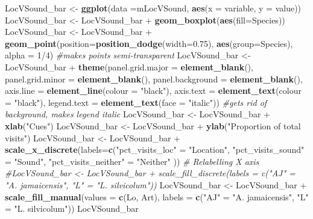 \documentclass[]{article}
\newenvironment{Shaded}{\begin{snugshade}}{\end{snugshade}}
\newcommand{\KeywordTok}[1]{\textcolor[rgb]{0.13,0.29,0.53}{\textbf{{#1}}}}
\newcommand{\DataTypeTok}[1]{\textcolor[rgb]{0.13,0.29,0.53}{{#1}}}
\newcommand{\DecValTok}[1]{\textcolor[rgb]{0.00,0.00,0.81}{{#1}}}
\newcommand{\FloatTok}[1]{\textcolor[rgb]{0.00,0.00,0.81}{{#1}}}
\newcommand{\StringTok}[1]{\textcolor[rgb]{0.31,0.60,0.02}{{#1}}}
\newcommand{\CommentTok}[1]{\textcolor[rgb]{0.56,0.35,0.01}{\textit{{#1}}}}
\newcommand{\NormalTok}[1]{{#1}}
\begin{document}
\begin{Shaded}
\begin{Highlighting}[]
\NormalTok{LocVSound_bar <-}\StringTok{ }\KeywordTok{ggplot}\NormalTok{(}\DataTypeTok{data =}\NormalTok{mLocVSound, }\KeywordTok{aes}\NormalTok{(}\DataTypeTok{x =} \NormalTok{variable, }\DataTypeTok{y =} \NormalTok{value))}
\NormalTok{LocVSound_bar <-}\StringTok{ }\NormalTok{LocVSound_bar +}\StringTok{ }\KeywordTok{geom_boxplot}\NormalTok{(}\KeywordTok{aes}\NormalTok{(}\DataTypeTok{fill=}\NormalTok{Species))}
\NormalTok{LocVSound_bar <-}\StringTok{ }\NormalTok{LocVSound_bar +}\StringTok{ }\KeywordTok{geom_point}\NormalTok{(}\DataTypeTok{position=}\KeywordTok{position_dodge}\NormalTok{(}\DataTypeTok{width=}\FloatTok{0.75}\NormalTok{), }\KeywordTok{aes}\NormalTok{(}\DataTypeTok{group=}\NormalTok{Species), }\DataTypeTok{alpha =} \DecValTok{1}\NormalTok{/}\DecValTok{4}\NormalTok{) }\CommentTok{#makes points semi-transparent}
\NormalTok{LocVSound_bar <-}\StringTok{ }\NormalTok{LocVSound_bar +}\StringTok{ }\KeywordTok{theme}\NormalTok{(}\DataTypeTok{panel.grid.major =} \KeywordTok{element_blank}\NormalTok{(), }\DataTypeTok{panel.grid.minor =} \KeywordTok{element_blank}\NormalTok{(),}
\DataTypeTok{panel.background =} \KeywordTok{element_blank}\NormalTok{(), }\DataTypeTok{axis.line =} \KeywordTok{element_line}\NormalTok{(}\DataTypeTok{colour =} \StringTok{"black"}\NormalTok{), }\DataTypeTok{axis.text =} \KeywordTok{element_text}\NormalTok{(}\DataTypeTok{colour =} \StringTok{"black"}\NormalTok{), }\DataTypeTok{legend.text =} \KeywordTok{element_text}\NormalTok{(}\DataTypeTok{face =} \StringTok{"italic"}\NormalTok{))  }\CommentTok{#gets rid of background, makes legend italic}
\NormalTok{LocVSound_bar <-}\StringTok{ }\NormalTok{LocVSound_bar +}\StringTok{ }\KeywordTok{xlab}\NormalTok{(}\StringTok{"Cues"}\NormalTok{)}
\NormalTok{LocVSound_bar <-}\StringTok{ }\NormalTok{LocVSound_bar +}\StringTok{ }\KeywordTok{ylab}\NormalTok{(}\StringTok{"Proportion of total visits"}\NormalTok{)}
\NormalTok{LocVSound_bar <-}\StringTok{ }\NormalTok{LocVSound_bar +}\StringTok{ }\KeywordTok{scale_x_discrete}\NormalTok{(}\DataTypeTok{labels=}\KeywordTok{c}\NormalTok{(}\StringTok{"pct_visits_loc"} \NormalTok{=}\StringTok{ "Location"}\NormalTok{, }\StringTok{"pct_visits_sound"} \NormalTok{=}\StringTok{ "Sound"}\NormalTok{,}
                              \StringTok{"pct_visits_neither"} \NormalTok{=}\StringTok{ "Neither"} \NormalTok{))  }\CommentTok{# Relabelling X axis}
\CommentTok{#LocVSound_bar <- LocVSound_bar + scale_fill_discrete(labels = c("AJ" = "A. jamaicensis", "L" = "L. silvicolum"))}
\NormalTok{LocVSound_bar <-}\StringTok{ }\NormalTok{LocVSound_bar +}\StringTok{ }\KeywordTok{scale_fill_manual}\NormalTok{(}\DataTypeTok{values =} \KeywordTok{c}\NormalTok{(Lo, Art), }\DataTypeTok{labels =} \KeywordTok{c}\NormalTok{(}\StringTok{"AJ"} \NormalTok{=}\StringTok{ "A. jamaicensis"}\NormalTok{, }\StringTok{"L"} \NormalTok{=}\StringTok{ "L. silvicolum"}\NormalTok{))}
\NormalTok{LocVSound_bar}
\end{Highlighting}
\end{Shaded}
\end{document}
